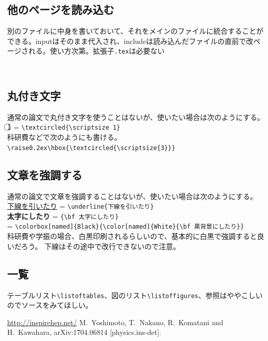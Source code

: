 \documentclass[a4j]{jsarticle}
\begin{document}
\subsection{他のページを読み込む}
別のファイルに中身を書いておいて、それをメインのファイルに統合することができる。inputはそのまま代入され、includeは読み込んだファイルの直前で改ページされる。使い方次第。拡張子\verb|.tex|は必要ない
\begin{verbatim}


\end{verbatim}

\subsection{丸付き文字}
通常の論文で丸付き文字を使うことはないが、使いたい場合は次のようにする。
\textcircled{\scriptsize 1} = \verb|\textcircled{\scriptsize 1}|\\
科研費などで次のようにも書ける。\verb|\raise0.2ex\hbox{\textcircled{\scriptsize{3}}}|

\subsection{文章を強調する}
通常の論文で文章を強調することはないが、使いたい場合は次のようにする。
\noindent
\underline{下線を引いたり} = \verb|\underline{下線を引いたり}|\\
{\bf 太字にしたり} = \verb|{\bf 太字にしたり}|\\
\colorbox[named]{Black}{\color[named]{White}{\bf 黒背景にしたり}} = \verb|\colorbox[named]{Black}{\color[named]{White}{\bf 黒背景にしたり}}|\\
科研費や学振の場合、白黒印刷されるらしいので、基本的に白黒で強調すると良いだろう。 下線はその途中で改行できないので注意。

\subsection{一覧}
テーブルリスト\verb|\listoftables|、図のリスト\verb|\listoffigures|、参照はややこしいのでソースをみてほしい。
\listoftables %
\listoffigures %

\begin{thebibliography}{99}
\url{http://inspirehep.net/}
  M.~Yoshimoto, T.~Nakano, R.~Komatani and H.~Kawahara,
  arXiv:1704.06814 [physics.ins-det].
\end{thebibliography}
\end{document}
